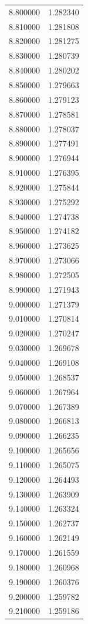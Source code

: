 \begin{tabular}{rr}
8.800000 & 1.282340 \\
8.810000 & 1.281808 \\
8.820000 & 1.281275 \\
8.830000 & 1.280739 \\
8.840000 & 1.280202 \\
8.850000 & 1.279663 \\
8.860000 & 1.279123 \\
8.870000 & 1.278581 \\
8.880000 & 1.278037 \\
8.890000 & 1.277491 \\
8.900000 & 1.276944 \\
8.910000 & 1.276395 \\
8.920000 & 1.275844 \\
8.930000 & 1.275292 \\
8.940000 & 1.274738 \\
8.950000 & 1.274182 \\
8.960000 & 1.273625 \\
8.970000 & 1.273066 \\
8.980000 & 1.272505 \\
8.990000 & 1.271943 \\
9.000000 & 1.271379 \\
9.010000 & 1.270814 \\
9.020000 & 1.270247 \\
9.030000 & 1.269678 \\
9.040000 & 1.269108 \\
9.050000 & 1.268537 \\
9.060000 & 1.267964 \\
9.070000 & 1.267389 \\
9.080000 & 1.266813 \\
9.090000 & 1.266235 \\
9.100000 & 1.265656 \\
9.110000 & 1.265075 \\
9.120000 & 1.264493 \\
9.130000 & 1.263909 \\
9.140000 & 1.263324 \\
9.150000 & 1.262737 \\
9.160000 & 1.262149 \\
9.170000 & 1.261559 \\
9.180000 & 1.260968 \\
9.190000 & 1.260376 \\
9.200000 & 1.259782 \\
9.210000 & 1.259186 \\

\end{tabular}

